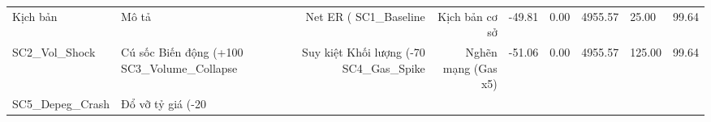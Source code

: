 \begin{tabular}{llrrrrr}
\toprule
Kịch bản & Mô tả & Net ER (%
\midrule
SC1_Baseline & Kịch bản cơ sở & -49.81 & 0.00 & 4955.57 & 25.00 & 99.64 \\
SC2_Vol_Shock & Cú sốc Biến động (+100%
SC3_Volume_Collapse & Suy kiệt Khối lượng (-70%
SC4_Gas_Spike & Nghẽn mạng (Gas x5) & -51.06 & 0.00 & 4955.57 & 125.00 & 99.64 \\
SC5_Depeg_Crash & Đổ vỡ tỷ giá (-20%
\bottomrule
\end{tabular}
